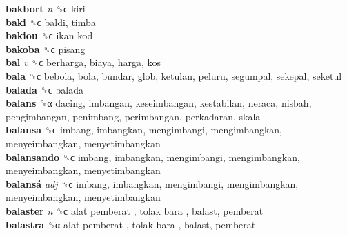 \textbf{bakbort} \emph{n}  ␝ϲ  kiri  \\
\textbf{baki} ␝ϲ  baldi, timba  \\
\textbf{bakiou} ␝ϲ   ikan kod   \\
\textbf{bakoba} ␝ϲ  pisang  \\
\textbf{bal} \emph{v}  ␝ϲ  berharga, biaya, harga, kos  \\
\textbf{bala} ␝ϲ  bebola, bola, bundar, glob, ketulan, peluru, segumpal, sekepal, seketul  \\
\textbf{balada} ␝ϲ  balada  \\
\textbf{balans} ␝α  dacing, imbangan, keseimbangan, kestabilan, neraca, nisbah, pengimbangan, penimbang, perimbangan, perkadaran, skala  \\
\textbf{balansa} ␝ϲ  imbang, imbangkan, mengimbangi, mengimbangkan, menyeimbangkan, menyetimbangkan  \\
\textbf{balansando} ␝ϲ  imbang, imbangkan, mengimbangi, mengimbangkan, menyeimbangkan, menyetimbangkan  \\
\textbf{balansá} \emph{adj}  ␝ϲ  imbang, imbangkan, mengimbangi, mengimbangkan, menyeimbangkan, menyetimbangkan  \\
\textbf{balaster} \emph{n}  ␝ϲ   alat pemberat ,  tolak bara , balast, pemberat  \\
\textbf{balastra} ␝α   alat pemberat ,  tolak bara , balast, pemberat  \\
